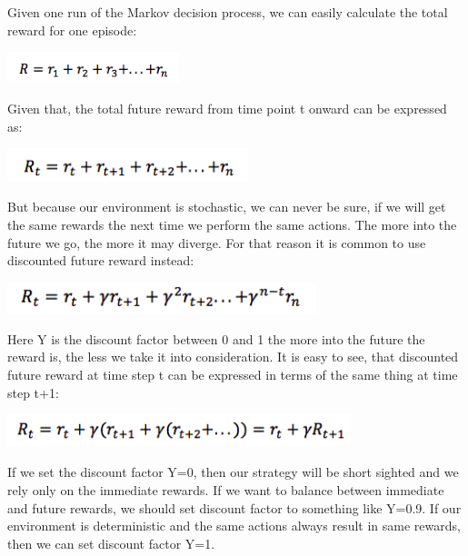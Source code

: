 \documentclass[a4paper,11pt]{article}
\begin{document}
				Given one run of the Markov decision process, we can easily calculate the total reward for one episode:\\
				\begin{centering}
				\includegraphics[width=5cm]{../Design/images/dfr.png}\\
				\end{centering}
				Given that, the total future reward from time point t onward can be expressed as:\\
				\begin{centering}
				\includegraphics[width=7cm]{../Design/images/dfr2.png}\\
				\end{centering}
				But because our environment is stochastic, we can never be sure, if we will get the same rewards the next time we perform the same actions. The more into the future we go, the more it may diverge. For that reason it is common to use discounted future reward instead:\\
				\begin{centering}
				\includegraphics[width=9cm]{../Design/images/dfr3.png}\\
				\end{centering}
				Here Y is the discount factor between 0 and 1 the more into the future the reward is, the less we take it into consideration. It is easy to see, that discounted future reward at time step t can be expressed in terms of the same thing at time step t+1:\\
				\begin{centering}
				\includegraphics[width=10cm]{../Design/images/dfr4.png}\\
				\end{centering}
				If we set the discount factor Y=0, then our strategy will be short sighted and we rely only on the immediate rewards. If we want to balance between immediate and future rewards, we should set discount factor to something like Y=0.9. If our environment is deterministic and the same actions always result in same rewards, then we can set discount factor Y=1.\\
\end{document}
